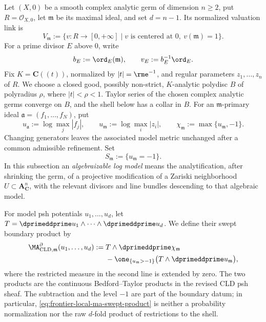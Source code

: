 Let \((X,0)\) be a smooth complex analytic germ of dimension \(n\geq2\), put
\(R=\mathcal O_{X,0}\), let \(\mathfrak m\) be its maximal ideal, and set
\(d=n-1\).  Its normalized valuation link is
\begin{equation}
 V_{\mathfrak m}
 :=\{v:R\longrightarrow[0,+\infty]\mid
       v\text{ is centered at }0,\ v(\mathfrak m)=1\}.
 \label{eq:frontier-local-ma-link}
\end{equation}
For a prime divisor \(E\) above \(0\), write
\begin{equation}
 b_E:=\ord_E(\mathfrak m),
 \qquad v_E:=b_E^{-1}\ord_E.
 \label{eq:frontier-local-ma-divisorial-normalization}
\end{equation}
Fix \(K=\mathbf C((t))\), normalized by \(|t|=\rme^{-1}\), and regular
parameters \(z_1,\ldots,z_n\) of \(R\).  We choose a closed good, possibly
non-strict, \(K\)-analytic polydisc \(B\) of polyradius \(\rho\), where
\(|t|<\rho<1\).  Taylor series of the chosen complex analytic germs converge
on \(B\), and the shell below has a collar in \(B\).  For an
\(\mathfrak m\)-primary ideal
\(\mathfrak a=(f_1,\ldots,f_N)\), put
\begin{equation}
 u_{\mathfrak a}:=\log\max_j|f_j|,
 \qquad
 u_{\mathfrak m}:=\log\max_i|z_i|,
 \qquad
 \chi_{\mathfrak m}:=\max\{u_{\mathfrak m},-1\}.
 \label{eq:frontier-local-ma-model-functions}
\end{equation}
Changing generators leaves the associated model metric unchanged after a
common admissible refinement.  Set
\begin{equation}
S_{\mathfrak m}:=\{u_{\mathfrak m}=-1\}.
\label{eq:frontier-local-ma-shell}
\end{equation}
In this subsection an \emph{algebraizable log model} means the
analytification, after shrinking the germ, of a projective modification of a
Zariski neighborhood \(U\subset\mathbf A^n_{\mathbf C}\), with the relevant
divisors and line bundles descending to that algebraic model.

For model psh potentials \(u_1,\ldots,u_d\), let
\(T=\dprimeddprime u_1\wedge\cdots\wedge\dprimeddprime u_d\).  We define
their swept boundary product by
\begin{equation}
 \begin{split}
 \MA^{\partial}_{\mathrm{CLD},\mathfrak m}
       (u_1,\ldots,u_d)
 :={}&T\wedge\dprimeddprime\chi_{\mathfrak m}\\
 &-\one_{\{u_{\mathfrak m}>-1\}}
       \bigl(T\wedge\dprimeddprime u_{\mathfrak m}\bigr),
 \end{split}
 \label{eq:frontier-local-ma-swept-product}
\end{equation}
where the restricted measure in the second line is extended by zero.  The
two products are the continuous Bedford--Taylor products in the revised CLD
psh sheaf.  The subtraction and the level \(-1\) are part of the boundary
datum; in particular, \eqref{eq:frontier-local-ma-swept-product} is neither a
probability normalization nor the raw \(d\)-fold product of restrictions to
the shell.


